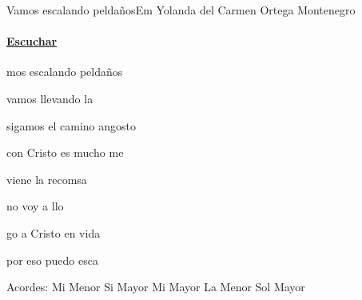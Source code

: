 \documentclass[12pt, spanish]{book}
\newcommand{\NotCCLIed}{\relax}
\begin{document}
    \begin{song}{Vamos escalando peldaños}{Em}
    {} %
    {Yolanda del Carmen Ortega Montenegro}
    {} %
    {} %
        \ifChordBk
        \paragraph{\mbox{}\hfill\protect\href{https://open.spotify.com/intl-es/track/0lt8S2YGKU5iOjhJeqLORB}{Escuchar}\mbox{}\hfill}
        \fi


        \begin{SBOpGroup}
            mos escalando peldaños

            vamos llevando la 

            sigamos el camino angosto

            con Cristo es mucho me
        \end{SBOpGroup}

        \begin{SBChorus}
             viene la recomsa

             no voy a llo

            go a Cristo en  vida

            por eso puedo esca
        \end{SBChorus}

        \ifChordBk
        \begin{SBOpGroup}
            Acordes:
            \upchord{\Em}\qquad Mi Menor \hfill
            \upchord{\B}\qquad Si Mayor \hfill\null\break
            \upchord{\E}\qquad Mi Mayor \hfill
            \upchord{\Am}\qquad La Menor \hfill
            \upchord{\G}\qquad Sol Mayor \hfill\null\break
        \end{SBOpGroup}
        \fi
    \end{song}
\end{document}
